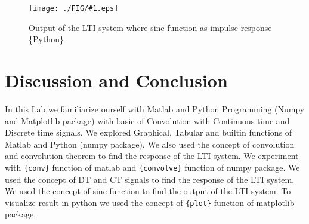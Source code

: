 \documentclass[a4paper,11pt]{article}
\newcommand{\pobs}[2]{
    \begin{figure}[H]
        \centering
        \texttt{[image: ./FIG/\#1.eps]}
        \caption{#2}
    \end{figure}
   
}
\begin{document}
\pobs{p4p}{ Output of the LTI system where sinc function as impulse response  \{Python\} }



\section{Discussion and Conclusion}
In this Lab we familiarize ourself with Matlab and Python Programming (Numpy and Matplotlib package)  with basic of Convolution with Continuous time and Discrete time signals. We explored Graphical, Tabular and builtin functions of Matlab and Python (numpy package). We also used the concept of convolution and convolution theorem to find the response of the LTI system. We experiment with \texttt{\{conv\}} function of matlab and \texttt{\{convolve\}} function of numpy package. We used the concept of DT and CT signals to find the response of the LTI system. We used the concept of sinc function to find the output of the LTI system. To visualize result in python we used the concept of \texttt{\{plot\}} function of matplotlib package.
\end{document}
